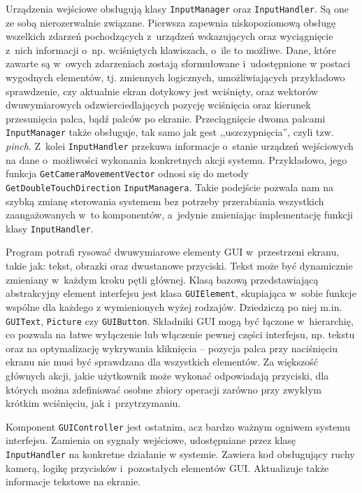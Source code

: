 		Urządzenia wejściowe obsługują klasy \texttt{InputManager} oraz \texttt{InputHandler}. Są one ze sobą nierozerwalnie związane. Pierwsza zapewnia niskopoziomową obsługę wszelkich zdarzeń pochodzących z~urządzeń wskazujących oraz wyciągnięcie z~nich informacji o~np. wciśniętych klawiszach, o~ile to możliwe. Dane, które zawarte są w~owych zdarzeniach zostają sformułowane i~udostępnione w postaci wygodnych elementów, tj. zmiennych logicznych, umożliwiających przykładowo sprawdzenie, czy aktualnie ekran dotykowy jest wciśnięty, oraz wektorów dwuwymiarowych odzwierciedlających pozycję wciśnięcia oraz kierunek przesunięcia palca, bądź palców po ekranie. Przeciągnięcie dwoma palcami \texttt{InputManager} także obsługuje, tak samo jak gest ,,uszczypnięcia'', czyli tzw. \emph{pinch}. Z~kolei \texttt{InputHandler} przekuwa informacje o~stanie urządzeń wejściowych na dane o~możliwości wykonania konkretnych akcji systemu. Przykładowo, jego funkcja \texttt{GetCameraMovementVector} odnosi się do metody \texttt{GetDoubleTouchDirection} \texttt{InputManagera}. Takie podejście pozwala nam na szybką zmianę sterowania systemem bez potrzeby przerabiania wszystkich zaangażowanych w~to komponentów, a~jedynie zmieniając implementację funkcji klasy \texttt{InputHandler}. 
		
		Program potrafi rysować dwuwymiarowe elementy GUI w~przestrzeni ekranu, takie jak: tekst, obrazki oraz dwustanowe przyciski.
		Tekst może być dynamicznie zmieniany w~każdym kroku pętli głównej. Klasą bazową przedstawiającą abstrakcyjny element interfejsu jest klasa \texttt{GUIElement}, skupiająca w~sobie funkcje wspólne dla każdego z wymienionych wyżej rodzajów. Dziedziczą po niej m.in. \texttt{GUIText}, \texttt{Picture} czy \texttt{GUIButton}. Składniki GUI mogą być łączone w~hierarchię, co pozwala na łatwe wyłączenie lub włączenie pewnej części interfejsu, np. tekstu oraz na optymalizację wykrywania kliknięcia -- pozycja palca przy naciśnięciu ekranu nie musi być sprawdzana dla wszystkich elementów. Za większość głównych akcji, jakie użytkownik może wykonać odpowiadają przyciski, dla których można zdefiniować osobne zbiory operacji zarówno przy zwykłym krótkim wciśnięciu, jak i~przytrzymaniu.
		
		Komponent \texttt{GUIController} jest ostatnim, acz bardzo ważnym ogniwem systemu interfejsu. Zamienia on sygnały wejściowe, udostępniane przez klasę \texttt{InputHandler} na konkretne działanie w systemie. Zawiera kod obsługujący ruchy kamerą, logikę przycisków i~pozostałych elementów GUI. Aktualizuje także informacje tekstowe na ekranie. 
		
